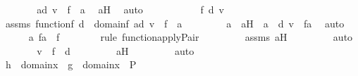 \begin{isabellebody}
\ \ \ \ \isamarkupfalse%
\ \isamarkupfalse%
\ {\isachardoublequoteopen}{\isasymexists}a{\isasymin}d{\isachardot}{\kern0pt}\ v\ {\isacharequal}{\kern0pt}\ f\ {\isacharbackquote}{\kern0pt}\ a{\isachardoublequoteclose}\ \isamarkupfalse%
\ aH\ \isamarkupfalse%
\ auto\ \isanewline
\ \ \isamarkupfalse%
\ \isanewline
\ \ \ \ \isamarkupfalse%
\ f\ d\ v\ \isamarkupfalse%
\ assms{}{\isacharcolon}{\kern0pt}\ {\isachardoublequoteopen}function{\isacharparenleft}{\kern0pt}f{\isacharparenright}{\kern0pt}{\isachardoublequoteclose}\ {\isachardoublequoteopen}d\ {\isasymsubseteq}\ domain{\isacharparenleft}{\kern0pt}f{\isacharparenright}{\kern0pt}{\isachardoublequoteclose}\ {\isachardoublequoteopen}{\isasymexists}a{\isasymin}d{\isachardot}{\kern0pt}\ v\ {\isacharequal}{\kern0pt}\ f\ {\isacharbackquote}{\kern0pt}\ a{\isachardoublequoteclose}\ \isanewline
\ \ \ \ \isamarkupfalse%
\ \isamarkupfalse%
\ a\ \ aH\ {\isacharcolon}{\kern0pt}\ {\isachardoublequoteopen}a\ {\isasymin}\ d{\isachardoublequoteclose}\ {\isachardoublequoteopen}v\ {\isacharequal}{\kern0pt}\ f{\isacharbackquote}{\kern0pt}a{\isachardoublequoteclose}\ \isamarkupfalse%
\ auto\ \isanewline
\ \ \ \ \isamarkupfalse%
\ {\isachardoublequoteopen}{\isacharless}{\kern0pt}a{\isacharcomma}{\kern0pt}\ f{\isacharbackquote}{\kern0pt}a{\isachargreater}{\kern0pt}\ {\isasymin}\ f{\isachardoublequoteclose}\ \isanewline
\ \ \ \ \ \ \isamarkupfalse%
{\isacharparenleft}{\kern0pt}rule\ function{\isacharunderscore}{\kern0pt}apply{\isacharunderscore}{\kern0pt}Pair{\isacharparenright}{\kern0pt}\ \isanewline
\ \ \ \ \ \ \isamarkupfalse%
\ assms{}\ aH\ \isanewline
\ \ \ \ \ \ \isamarkupfalse%
\ auto\isanewline
\ \ \ \ \isamarkupfalse%
\ \isamarkupfalse%
\ {\isachardoublequoteopen}v\ {\isasymin}\ f\ {\isacharbackquote}{\kern0pt}{\isacharbackquote}{\kern0pt}\ d{\isachardoublequoteclose}\ \isanewline
\ \ \ \ \ \ \isamarkupfalse%
\ aH\ \isanewline
\ \ \ \ \ \ \isamarkupfalse%
\ auto\isanewline
\ \ \isamarkupfalse%
\isanewline
\isanewline
\ \ \isamarkupfalse%
\ {\isachardoublequoteopen}h\ {\isacharbackquote}{\kern0pt}{\isacharbackquote}{\kern0pt}\ domain{\isacharparenleft}{\kern0pt}x{\isacharparenright}{\kern0pt}\ {\isacharequal}{\kern0pt}\ g\ {\isacharbackquote}{\kern0pt}{\isacharbackquote}{\kern0pt}\ {\isacharparenleft}{\kern0pt}domain{\isacharparenleft}{\kern0pt}x{\isacharparenright}{\kern0pt}\ {\isasymtimes}\ {\isacharbraceleft}{\kern0pt}P{\isacharbraceright}{\kern0pt}{\isacharparenright}{\kern0pt}{\isachardoublequoteclose}\ \isanewline

\end{isabellebody}
